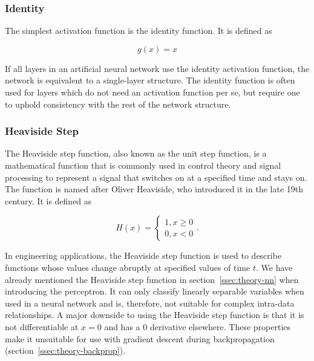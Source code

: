 \documentclass[draft,final]{vutinfth} %
\begin{document}
\subsubsection{Identity}
\label{sssec:theory-identity}

The simplest activation function is the identity function. It is defined as

\begin{equation}
  \label{eq:identity}
  g(x) = x
\end{equation}

If all layers in an artificial neural network use the identity
activation function, the network is equivalent to a single-layer
structure. The identity function is often used for layers which do not
need an activation function per se, but require one to uphold
consistency with the rest of the network structure.

\subsubsection{Heaviside Step}
\label{sssec:theory-heaviside}

The Heaviside step function, also known as the unit step function, is
a mathematical function that is commonly used in control theory and
signal processing to represent a signal that switches on at a
specified time and stays on. The function is named after Oliver
Heaviside, who introduced it in the late 19th century. It is defined
as

\begin{equation}
  \label{eq:heaviside}
  H(x) = 
  \begin{cases}
    1, x\geq 0 \\
    0, x < 0
  \end{cases}.
\end{equation}

In engineering applications, the Heaviside step function is used to
describe functions whose values change abruptly at specified values of
time $t$. We have already mentioned the Heaviside step function in
section~\ref{ssec:theory-nn} when introducing the perceptron. It can
only classify linearly separable variables when used in a neural
network and is, therefore, not suitable for complex intra-data
relationships. A major downside to using the Heaviside step function
is that it is not differentiable at $x = 0$ and has a $0$ derivative
elsewhere. These properties make it unsuitable for use with gradient
descent during backpropagation
(section~\ref{ssec:theory-backprop}).
\end{document}
